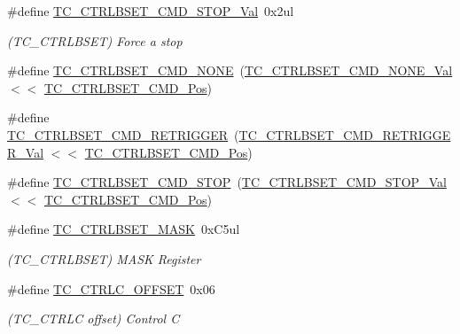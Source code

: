 \begin{DoxyCompactItemize}
\#define \mbox{\hyperlink{group___s_a_m_d21___t_c_gaa4a9a321dfc02191674396c7a2af47a4}{T\+C\+\_\+\+C\+T\+R\+L\+B\+S\+E\+T\+\_\+\+C\+M\+D\+\_\+\+S\+T\+O\+P\+\_\+\+Val}}~0x2ul
\begin{DoxyCompactList}\small\item\em (T\+C\+\_\+\+C\+T\+R\+L\+B\+S\+ET) Force a stop \end{DoxyCompactList}\item 
\#define \mbox{\hyperlink{group___s_a_m_d21___t_c_gab9e1c18dd358d27a2b0bf40e6a48f0e0}{T\+C\+\_\+\+C\+T\+R\+L\+B\+S\+E\+T\+\_\+\+C\+M\+D\+\_\+\+N\+O\+NE}}~(\mbox{\hyperlink{group___s_a_m_d21___t_c_gaa843c0929ee48527e9f3f6ffb9e3246f}{T\+C\+\_\+\+C\+T\+R\+L\+B\+S\+E\+T\+\_\+\+C\+M\+D\+\_\+\+N\+O\+N\+E\+\_\+\+Val}}      $<$$<$ \mbox{\hyperlink{group___s_a_m_d21___t_c_ga300926b23e1f7430a6e8a93d73fd98cc}{T\+C\+\_\+\+C\+T\+R\+L\+B\+S\+E\+T\+\_\+\+C\+M\+D\+\_\+\+Pos}})
\item 
\#define \mbox{\hyperlink{group___s_a_m_d21___t_c_ga1fe08462ba4191870b6a6b80624914df}{T\+C\+\_\+\+C\+T\+R\+L\+B\+S\+E\+T\+\_\+\+C\+M\+D\+\_\+\+R\+E\+T\+R\+I\+G\+G\+ER}}~(\mbox{\hyperlink{group___s_a_m_d21___t_c_gad87065a7d932e5e64d901a09e38552e6}{T\+C\+\_\+\+C\+T\+R\+L\+B\+S\+E\+T\+\_\+\+C\+M\+D\+\_\+\+R\+E\+T\+R\+I\+G\+G\+E\+R\+\_\+\+Val}} $<$$<$ \mbox{\hyperlink{group___s_a_m_d21___t_c_ga300926b23e1f7430a6e8a93d73fd98cc}{T\+C\+\_\+\+C\+T\+R\+L\+B\+S\+E\+T\+\_\+\+C\+M\+D\+\_\+\+Pos}})
\item 
\#define \mbox{\hyperlink{group___s_a_m_d21___t_c_gaedd7ee97015bf0118ff00a40ac458d29}{T\+C\+\_\+\+C\+T\+R\+L\+B\+S\+E\+T\+\_\+\+C\+M\+D\+\_\+\+S\+T\+OP}}~(\mbox{\hyperlink{group___s_a_m_d21___t_c_gaa4a9a321dfc02191674396c7a2af47a4}{T\+C\+\_\+\+C\+T\+R\+L\+B\+S\+E\+T\+\_\+\+C\+M\+D\+\_\+\+S\+T\+O\+P\+\_\+\+Val}}      $<$$<$ \mbox{\hyperlink{group___s_a_m_d21___t_c_ga300926b23e1f7430a6e8a93d73fd98cc}{T\+C\+\_\+\+C\+T\+R\+L\+B\+S\+E\+T\+\_\+\+C\+M\+D\+\_\+\+Pos}})
\item 
\#define \mbox{\hyperlink{group___s_a_m_d21___t_c_ga64f0fcfecae1a0dc0bcc2bd428b25ef1}{T\+C\+\_\+\+C\+T\+R\+L\+B\+S\+E\+T\+\_\+\+M\+A\+SK}}~0x\+C5ul
\begin{DoxyCompactList}\small\item\em (T\+C\+\_\+\+C\+T\+R\+L\+B\+S\+ET) M\+A\+SK Register \end{DoxyCompactList}\item 
\#define \mbox{\hyperlink{group___s_a_m_d21___t_c_gab884f0dc64706ffe22da01323156218d}{T\+C\+\_\+\+C\+T\+R\+L\+C\+\_\+\+O\+F\+F\+S\+ET}}~0x06
\begin{DoxyCompactList}\small\item\em (T\+C\+\_\+\+C\+T\+R\+LC offset) Control C \end{DoxyCompactList}\item 
$$
\end{DoxyCompactItemize}
